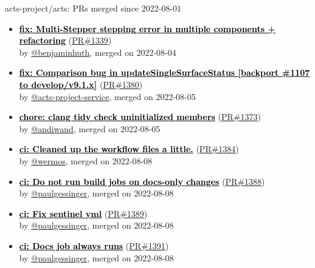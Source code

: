 \documentclass{beamer}
\begin{document}
\begin{frame}[allowframebreaks]{ acts-project/acts: PRs merged since 2022-08-01 }
\begin{itemize}
    \item
    \textbf{\href{https://github.com/acts-project/acts/pull/1339}{\textcolor{black}{fix: Multi-Stepper stepping error in multiple components + refactoring}}}
    (\href{https://github.com/acts-project/acts/pull/1339}{PR\#1339}) \\
    by \href{https://github.com/benjaminhuth}{ @benjaminhuth}, merged on 2022-08-04

    \item
    \textbf{\href{https://github.com/acts-project/acts/pull/1380}{\textcolor{black}{fix: Comparison bug in updateSingleSurfaceStatus [backport \#1107 to develop/v9.1.x]}}}
    (\href{https://github.com/acts-project/acts/pull/1380}{PR\#1380}) \\
    by \href{https://github.com/acts-project-service}{ @acts-project-service}, merged on 2022-08-05

    \item
    \textbf{\href{https://github.com/acts-project/acts/pull/1373}{\textcolor{black}{chore: clang tidy check uninitialized members}}}
    (\href{https://github.com/acts-project/acts/pull/1373}{PR\#1373}) \\
    by \href{https://github.com/andiwand}{ @andiwand}, merged on 2022-08-05

    \item
    \textbf{\href{https://github.com/acts-project/acts/pull/1384}{\textcolor{black}{ci: Cleaned up the workflow files a little.}}}
    (\href{https://github.com/acts-project/acts/pull/1384}{PR\#1384}) \\
    by \href{https://github.com/wermos}{ @wermos}, merged on 2022-08-08

    \item
    \textbf{\href{https://github.com/acts-project/acts/pull/1388}{\textcolor{black}{ci: Do not run build jobs on docs-only changes}}}
    (\href{https://github.com/acts-project/acts/pull/1388}{PR\#1388}) \\
    by \href{https://github.com/paulgessinger}{ @paulgessinger}, merged on 2022-08-08

    \item
    \textbf{\href{https://github.com/acts-project/acts/pull/1389}{\textcolor{black}{ci: Fix sentinel yml}}}
    (\href{https://github.com/acts-project/acts/pull/1389}{PR\#1389}) \\
    by \href{https://github.com/paulgessinger}{ @paulgessinger}, merged on 2022-08-08

    \item
    \textbf{\href{https://github.com/acts-project/acts/pull/1391}{\textcolor{black}{ci: Docs job always runs}}}
    (\href{https://github.com/acts-project/acts/pull/1391}{PR\#1391}) \\
    by \href{https://github.com/paulgessinger}{ @paulgessinger}, merged on 2022-08-08


\end{itemize}
\end{frame}
\end{document}
